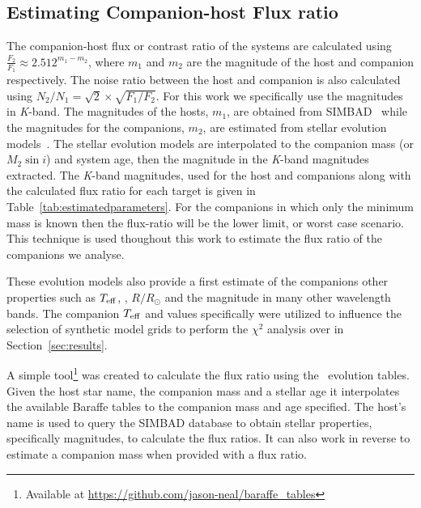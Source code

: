 \subsection{Estimating Companion-host Flux ratio}
\label{compaion flux ratio}
The companion-host flux or contrast ratio of the systems are calculated using \( \frac{F_{2}}{F_{1}} \approx 2.512^{m_{1}-m_{2}} \), where \(m_{1} \) and \(m_{2} \) are the magnitude of the host and companion respectively. The noise ratio between the host and companion is also calculated using \(N_{2}/N_{1} = \sqrt{2} \times\sqrt{F_{1}/F_{2}}\).  For this work we specifically use the magnitudes in \textit{K}-band. The magnitudes of the hosts, \(m_{1} \), are obtained from SIMBAD~\citep{wenger_simbad_2000} while the magnitudes for the companions, \(m_{2} \), are estimated from stellar evolution models~\citet{baraffe_evolutionary_2003, baraffe_new_2015}. The stellar evolution models are interpolated to the companion mass (or \(M_{2}\sin{i}\)) and system age, then the magnitude in the \textit{K}-band magnitudes extracted. The \textit{K}-band magnitudes, used for the host and companions along with the calculated flux ratio for each target is given in Table~\ref{tab:estimatedparameters}. For the companions in which only the minimum mass is known then the flux-ratio will be the lower limit, or worst case scenario. This technique is used thoughout this work to estimate the flux ratio of the companions we analyse.

These evolution models also provide a first estimate of the companions other properties such as \(T_{\mathrm{eff}}{}\), \logg{}, \(R/R_{\odot}\) and the magnitude in many other wavelength bands. The companion \(T_{\mathrm{eff}}{}\) and \logg{} values specifically were utilized to influence the selection of synthetic model grids to perform the \(\chi^2\) analysis over in Section~\ref{sec:results}.

A simple tool\footnote{Available at \url{https://github.com/jason-neal/baraffe_tables}} was created to calculate the flux ratio using the~\citep{baraffe_evolutionary_2003,baraffe_new_2015} evolution tables. Given the host star name, the companion mass and a stellar age it interpolates the available Baraffe tables to the companion mass and age specified. The host's name is used to query the {SIMBAD} database to obtain stellar properties, specifically magnitudes, to calculate the flux ratios. It can also work in reverse to estimate a companion mass when provided with a flux ratio.


